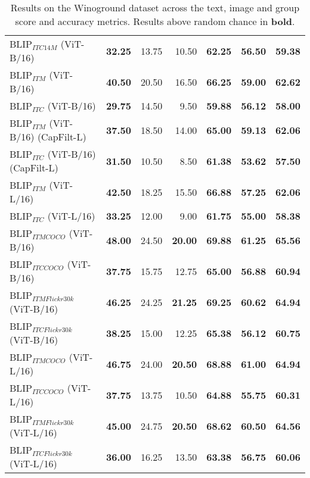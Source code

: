 \begin{table}[ht]
\begin{tabular}{l|rrr|rrr}
 BLIP$_{ITC 14M}$ (ViT-B/16)         & \textbf{32.25} & 13.75          & 10.50          & \textbf{62.25} & \textbf{56.50} & \textbf{59.38} \\
 BLIP$_{ITM}$ (ViT-B/16)             & \textbf{40.50} & 20.50          & 16.50          & \textbf{66.25} & \textbf{59.00} & \textbf{62.62} \\
 BLIP$_{ITC}$ (ViT-B/16)             & \textbf{29.75} & 14.50          & 9.50           & \textbf{59.88} & \textbf{56.12} & \textbf{58.00} \\
 BLIP$_{ITM}$ (ViT-B/16) (CapFilt-L) & \textbf{37.50} & 18.50          & 14.00          & \textbf{65.00} & \textbf{59.13} & \textbf{62.06} \\
 BLIP$_{ITC}$ (ViT-B/16) (CapFilt-L) & \textbf{31.50} & 10.50          & 8.50           & \textbf{61.38} & \textbf{53.62} & \textbf{57.50} \\
 BLIP$_{ITM}$ (ViT-L/16)             & \textbf{42.50} & 18.25          & 15.50          & \textbf{66.88} & \textbf{57.25} & \textbf{62.06} \\
 BLIP$_{ITC}$ (ViT-L/16)             & \textbf{33.25} & 12.00          & 9.00           & \textbf{61.75} & \textbf{55.00} & \textbf{58.38} \\
 BLIP$_{ITM COCO}$ (ViT-B/16)        & \textbf{48.00} & 24.50          & \textbf{20.00} & \textbf{69.88} & \textbf{61.25} & \textbf{65.56} \\
 BLIP$_{ITC COCO}$ (ViT-B/16)        & \textbf{37.75} & 15.75          & 12.75          & \textbf{65.00} & \textbf{56.88} & \textbf{60.94} \\
 BLIP$_{ITM Flickr30k}$ (ViT-B/16)   & \textbf{46.25} & 24.25          & \textbf{21.25} & \textbf{69.25} & \textbf{60.62} & \textbf{64.94} \\
 BLIP$_{ITC Flickr30k}$ (ViT-B/16)   & \textbf{38.25} & 15.00          & 12.25          & \textbf{65.38} & \textbf{56.12} & \textbf{60.75} \\
 BLIP$_{ITM COCO}$ (ViT-L/16)        & \textbf{46.75} & 24.00          & \textbf{20.50} & \textbf{68.88} & \textbf{61.00} & \textbf{64.94} \\
 BLIP$_{ITC COCO}$ (ViT-L/16)        & \textbf{37.75} & 13.75          & 10.50          & \textbf{64.88} & \textbf{55.75} & \textbf{60.31} \\
 BLIP$_{ITM Flickr30k}$ (ViT-L/16)   & \textbf{45.00} & 24.75          & \textbf{20.50} & \textbf{68.62} & \textbf{60.50} & \textbf{64.56} \\
 BLIP$_{ITC Flickr30k}$ (ViT-L/16)   & \textbf{36.00} & 16.25          & 13.50          & \textbf{63.38} & \textbf{56.75} & \textbf{60.06} \\
\bottomrule
\end{tabular}
\caption{Results on the Winoground dataset across the text, image and group score and accuracy metrics. Results above random chance in \textbf{bold}.}
\label{tab:results_aggr_ours}
\end{table}

